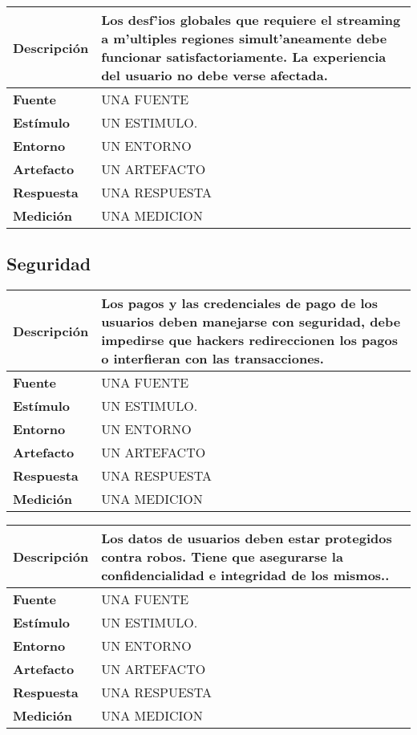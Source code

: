 \begin{center}
  \begin{tabular}{| l | p{10cm} | }
    \hline
  \textbf{Descripción} & Los desf'ios globales que requiere el streaming a m'ultiples regiones simult'aneamente debe funcionar satisfactoriamente. La experiencia del usuario no debe verse afectada.\\  \hline
  \textbf{Fuente} & UNA FUENTE\\  \hline
  \textbf{Estímulo} & UN ESTIMULO.\\  \hline
  \textbf{Entorno} & UN ENTORNO\\  \hline
  \textbf{Artefacto} & UN ARTEFACTO\\  \hline
  \textbf{Respuesta} & UNA RESPUESTA\\  \hline
  \textbf{Medición} & UNA MEDICION\\  \hline
  \end{tabular}
\end{center} 


\subsection{Seguridad}

\begin{center}
  \begin{tabular}{| l | p{10cm} | }
    \hline
  \textbf{Descripción} & Los pagos y las credenciales de pago de los usuarios deben manejarse con seguridad, debe impedirse que hackers redireccionen los pagos o interfieran con las transacciones.\\  \hline
  \textbf{Fuente} & UNA FUENTE\\  \hline
  \textbf{Estímulo} & UN ESTIMULO.\\  \hline
  \textbf{Entorno} & UN ENTORNO\\  \hline
  \textbf{Artefacto} & UN ARTEFACTO\\  \hline
  \textbf{Respuesta} & UNA RESPUESTA\\  \hline
  \textbf{Medición} & UNA MEDICION\\  \hline
  \end{tabular}
\end{center} 

\begin{center}
  \begin{tabular}{| l | p{10cm} | }
    \hline
  \textbf{Descripción} & Los datos de usuarios deben estar protegidos contra robos. Tiene que asegurarse la confidencialidad e integridad de los mismos.. \\  \hline
  \textbf{Fuente} & UNA FUENTE\\  \hline
  \textbf{Estímulo} & UN ESTIMULO.\\  \hline
  \textbf{Entorno} & UN ENTORNO\\  \hline
  \textbf{Artefacto} & UN ARTEFACTO\\  \hline
  \textbf{Respuesta} & UNA RESPUESTA\\  \hline
  \textbf{Medición} & UNA MEDICION\\  \hline
  \end{tabular}
\end{center} 


